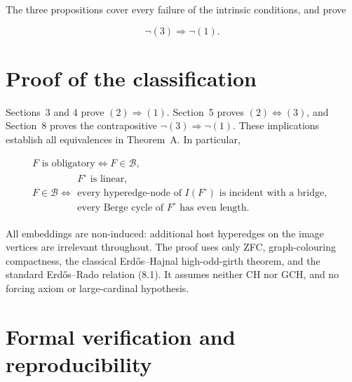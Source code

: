 \documentclass[a4paper,11pt,reqno]{amsart}
\theoremstyle{plain}
\theoremstyle{definition}
\theoremstyle{remark}
\begin{document}
The three propositions cover every failure of the intrinsic conditions, and prove

\[
\neg(3)\Longrightarrow\neg(1). \tag{8.2}
\]

\section{Proof of the classification}\label{conclusion}

Sections~3 and 4 prove \((2)\Longrightarrow(1)\). Section~5 proves
\((2)\Longleftrightarrow(3)\), and Section~8 proves the contrapositive
\(\neg(3)\Longrightarrow\neg(1)\). These implications establish all
equivalences in Theorem~A. In particular,

\begingroup\small
\[
\begin{gathered}
F\text{ is obligatory}
\iff
F\in\mathcal B,\\[1mm]
F\in\mathcal B
\iff
\begin{array}{l}
F^\circ\text{ is linear},\\[1mm]
\text{every hyperedge-node of }I(F^\circ)
\text{ is incident with a bridge},\\[1mm]
\text{every Berge cycle of }F^\circ\text{ has even length}.
\end{array}
\end{gathered}
\]
\endgroup

All embeddings are non-induced: additional host hyperedges on the image vertices are irrelevant throughout. The proof uses only ZFC, graph-colouring compactness, the classical Erd\H{o}s--Hajnal high-odd-girth theorem, and the standard Erd\H{o}s--Rado relation (8.1). It assumes neither CH nor GCH, and no forcing axiom or large-cardinal hypothesis.

\section*{Formal verification and reproducibility}
\end{document}
